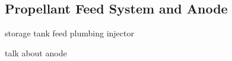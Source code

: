 \subsection{Propellant Feed System and Anode}

storage tank
feed plumbing
injector

talk about anode

